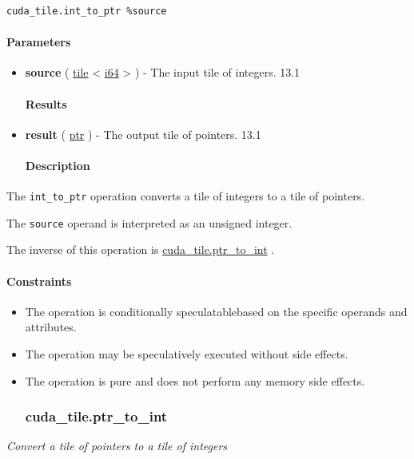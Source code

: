 \documentclass{article}
\begin{document}
\begin{lstlisting}
cuda_tile.int_to_ptr %source
\end{lstlisting}

\paragraph{Parameters}

\begin{itemize}
\item \textbf{source} ( \href{https://docs.nvidia.com/cuda/tile-ir/latest/sections/types.html#type-tile}{tile} < \href{https://docs.nvidia.com/cuda/tile-ir/latest/sections/types.html#subsection-element-types}{i64} > ) - The input tile of integers. 13.1


\paragraph{Results}

\item \textbf{result} ( \href{https://docs.nvidia.com/cuda/tile-ir/latest/sections/types.html#type-ptr}{ptr} ) - The output tile of pointers. 13.1


\paragraph{Description}

\end{itemize}
The \texttt{int\_to\_ptr} operation converts a tile of integers to a tile of pointers.


The \texttt{source} operand is interpreted as an unsigned integer.


The inverse of this operation is \href{https://docs.nvidia.com/cuda/tile-ir/latest/sections/operations.html#op-cuda-tile-ptr-to-int}{cuda\_tile.ptr\_to\_int} .



\paragraph{Constraints}

\begin{itemize}
\item The operation is conditionally speculatablebased on the specific operands and attributes.
\item The operation may be speculatively executed without side effects.
\item The operation is pure and does not perform any memory side effects.


\subsubsection{cuda\_tile.ptr\_to\_int}

\end{itemize}
\textit{Convert a tile of pointers to a tile of integers}
\end{document}
